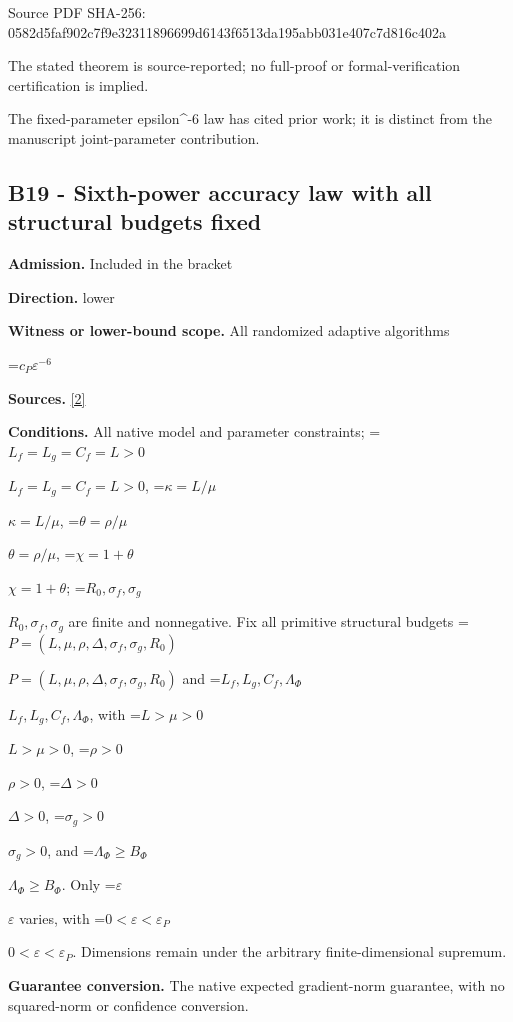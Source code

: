 \documentclass[10pt,a4paper]{article}
\newcommand{\AtlasMath}[1]{\par\begingroup\centering\setbox0=\hbox{$\displaystyle #1$}\ifdim\wd0>1.4\linewidth\typeout{ATLAS WIDE FORMULA: \the\wd0}\fi\ifdim\wd0>\linewidth\resizebox{\linewidth}{!}{\box0}\else\box0\fi\par\endgroup}
\newcommand{\AtlasInlineMath}[1]{\begingroup\setbox0=\hbox{$#1$}\ifdim\wd0>.4\linewidth\endgroup\AtlasMath{#1}\else\endgroup$#1$\fi}
\begin{document}
Source PDF SHA-256: 0582d5faf902c7f9e3231189\allowbreak{}6699d6143f6513da195abb03\allowbreak{}1e407c7d816c402a



The stated theorem is source-reported; no full-proof or formal-verification certification is implied.



The fixed-parameter epsilon\textasciicircum{}-6 law has cited prior work; it is distinct from the manuscript joint-parameter contribution.



\subsection{B19 - Sixth-power accuracy law with all structural budgets fixed}


\textbf{Admission.} Included in the bracket



\textbf{Direction.} lower



\textbf{Witness or lower-bound scope.} All randomized adaptive algorithms



\AtlasMath{c_P\varepsilon^{-6}}


\textbf{Sources.} \href{https://github.com/WU-Wendao/Colombo/blob/main/colombo_sensorium/Complexity_altas/data/sources/colombo/SFO_JOINT_20261126/manuscript.pdf}{[2]}



\textbf{Conditions.} All native model and parameter constraints; \AtlasInlineMath{L_f=L_g=C_f=L>0}, \AtlasInlineMath{\kappa=L/\mu}, \AtlasInlineMath{\theta=\rho/\mu}, \AtlasInlineMath{\chi=1+\theta}; \AtlasInlineMath{R_0,\sigma_f,\sigma_g} are finite and nonnegative. Fix all primitive structural budgets \AtlasInlineMath{P=(L,\mu,\rho,\Delta,\sigma_f,\sigma_g,R_0)} and \AtlasInlineMath{L_f,L_g,C_f,\Lambda_\Phi}, with \AtlasInlineMath{L>\mu>0}, \AtlasInlineMath{\rho>0}, \AtlasInlineMath{\Delta>0}, \AtlasInlineMath{\sigma_g>0}, and \AtlasInlineMath{\Lambda_\Phi\ge B_\Phi}. Only \AtlasInlineMath{\varepsilon} varies, with \AtlasInlineMath{0<\varepsilon<\varepsilon_P}. Dimensions remain under the arbitrary finite-dimensional supremum.



\textbf{Guarantee conversion.} The native expected gradient-norm guarantee, with no squared-norm or confidence conversion.
\end{document}
